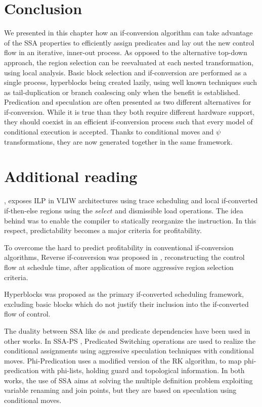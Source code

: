 \section{Conclusion} 

We presented in this chapter how an if-conversion algorithm can take advantage of the SSA properties to efficiently assign predicates and lay out the new control flow in an iterative, inner-out process. As opposed to the alternative top-down approach, the region selection can be reevaluated at each nested transformation, using local analysis.
Basic block selection and if-conversion are performed as a single process, hyperblocks being created lazily, using well known techniques such as tail-duplication or branch coalescing only when the benefit is established.
Predication and speculation are often presented as two different alternatives for if-conversion. While it is true than they both require different hardware support, they should coexist in an efficient if-conversion process such that every model of conditional execution is accepted. Thanks to conditional moves and $\psi$ transformations, they are now generated together in the same framework.

\section{Additional reading}

\cite{Rau:2003:IP:1074100.1074489}, exposes ILP in VLIW architectures using trace scheduling and local if-converted if-then-else regions using the $select$ and dismissible load operations. The idea behind was to enable the compiler to statically reorganize the instruction. In this respect, predictability \cite{Fisher:1992:PCB:143371.143493} becomes a major criteria for profitability.

To overcome the hard to predict profitability in conventional if-conversion algorithms, Reverse if-conversion was proposed in \cite{August:1999:PRI:326224.325595}, reconstructing the control flow at schedule time, after application of more aggressive region selection criteria.

Hyperblocks \cite{Mahlke:1992:ECS:144965.144998} was proposed as the primary if-converted scheduling framework, excluding basic blocks which do not justify their inclusion into the if-converted flow of control.

The duality between SSA like $\phi$s and predicate dependencies have been used in other works. In SSA-PS \cite{Jacome01clusteredvliw}, Predicated Switching operations are used to realize the conditional assignments using aggressive speculation techniques with conditional moves. Phi-Predication \cite{Chuang03phi-predicationfor} uses a modified version of the RK algorithm, to map phi-predication with phi-lists, holding guard and topological information. In both works, the use of SSA aims at solving the multiple definition problem exploiting variable renaming and join points, but they are based on speculation using conditional moves. 


